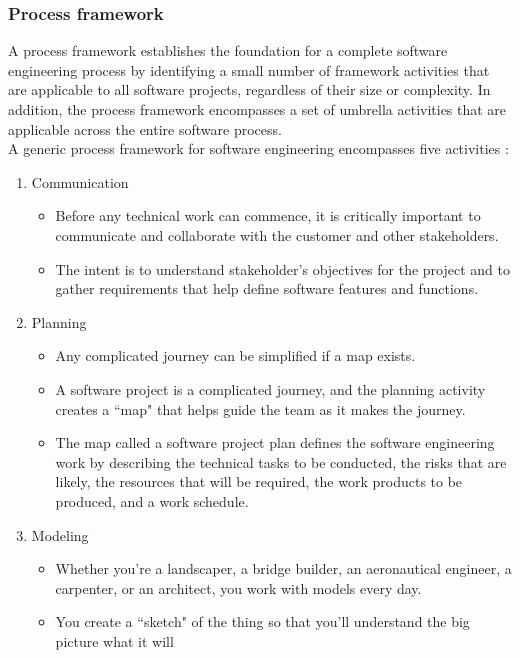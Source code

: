 \documentclass{article}
\begin{document}
	\subsubsection{Process framework}
	A process framework establishes the foundation for a complete software engineering process by identifying a
	small number of framework activities that are applicable to all software projects, regardless of their size
	or complexity.
	In addition, the process framework encompasses a set of umbrella activities that are applicable across the
	entire software process. \\

	\noindent A generic process framework for software engineering encompasses five activities :
	\begin{enumerate}
		\item Communication
			\begin{itemize}
				\item Before any technical work can commence, it is critically important to communicate and
					collaborate with the customer and other stakeholders.
				\item The intent is to understand stakeholder's objectives for the project and to gather
					requirements that help define software features and functions.
			\end{itemize}
		\item Planning
			\begin{itemize}
				\item Any complicated journey can be simplified if a map exists.
				\item A software project is a complicated journey, and the planning activity creates a ``map"
					that helps guide the team as it makes the journey.
				\item The map called a software project plan defines the software engineering work by describing
					the technical tasks to be conducted, the risks that are likely, the resources that will be
					required, the work products to be produced, and a work schedule.
			\end{itemize}
		\item Modeling
			\begin{itemize}
				\item Whether you're a landscaper, a bridge builder, an aeronautical engineer, a carpenter, or
					an architect, you work with models every day.
				\item You create a ``sketch" of the thing so that you'll understand the big picture what it will

\end{itemize}
\end{enumerate}
\end{document}
